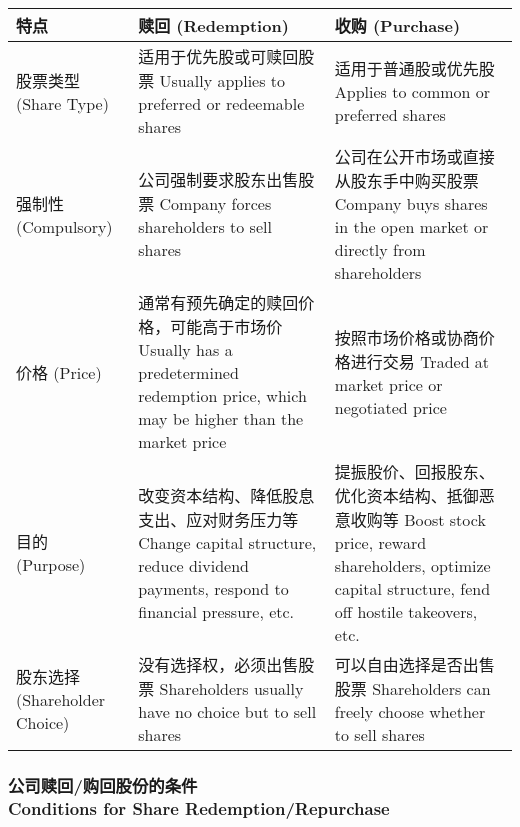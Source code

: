 \documentclass{article}
\begin{document}
\vspace{1em}
\begin{tabularx}{0.955\linewidth}{lXX}
    \toprule
    \textbf{特点} & \textbf{赎回 (Redemption)} & \textbf{收购 (Purchase)} \\
    \midrule
    股票类型 (Share Type) & 
    适用于优先股或可赎回股票 \newline
    Usually applies to preferred or redeemable shares & 
    适用于普通股或优先股 \newline
    Applies to common or preferred shares \\
    \midrule
    强制性 (Compulsory) & 
    公司强制要求股东出售股票 \newline
    Company forces shareholders to sell shares & 
    公司在公开市场或直接从股东手中购买股票 \newline
    Company buys shares in the open market or directly from shareholders \\
    \midrule
    价格 (Price) & 
    通常有预先确定的赎回价格，可能高于市场价 \newline
    Usually has a predetermined redemption price, which may be higher than the market price & 
    按照市场价格或协商价格进行交易 \newline
    Traded at market price or negotiated price \\
    \midrule
    目的 (Purpose) & 
    改变资本结构、降低股息支出、应对财务压力等 \newline
    Change capital structure, reduce dividend payments, respond to financial pressure, etc. & 
    提振股价、回报股东、优化资本结构、抵御恶意收购等 \newline
    Boost stock price, reward shareholders, optimize capital structure, fend off hostile takeovers, etc. \\
    \midrule
    股东选择 (Shareholder Choice) & 
    没有选择权，必须出售股票 \newline
    Shareholders usually have no choice but to sell shares & 
    可以自由选择是否出售股票 \newline
    Shareholders can freely choose whether to sell shares \\
    \bottomrule
\end{tabularx}

\subsubsection{公司赎回/购回股份的条件\\Conditions for Share Redemption/Repurchase}
\end{document}

